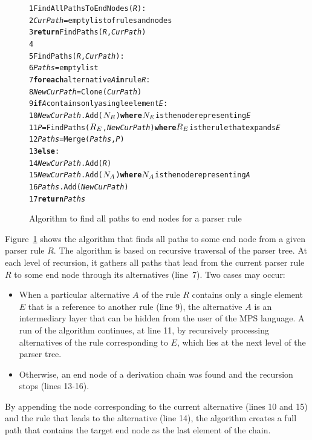 \begin{figure}[ht]
\begin{framed}
\begin{alltt}
\small
 1 FindAllPathsToEndNodes(\textit{R}):
 2   \textit{CurPath} = empty list of rules and nodes
 3   \textbf{return} FindPaths(\textit{R}, \textit{CurPath})
 4
 5 FindPaths(\textit{R}, \textit{CurPath}):
 6  \textit{Paths} = empty list
 7  \textbf{for each} alternative \textit{A} \textbf{in} rule \textit{R}:
 8    \textit{NewCurPath} = Clone(\textit{CurPath})
 9    \textbf{if} \textit{A} contains only a single element \textit{E}:
10      \textit{NewCurPath}.Add(\(N\sb{E}\)) \textbf{where} \(N\sb{E}\) is the node representing \textit{E}
11      \textit{P} = FindPaths(\(R\sb{E}\), \textit{NewCurPath}) \textbf{where} \(R\sb{E}\) is the rule that expands \textit{E}
12      \textit{Paths} = Merge(\textit{Paths}, \textit{P})
13    \textbf{else}:
14      \textit{NewCurPath}.Add(\textit{R})
15      \textit{NewCurPath}.Add(\(N\sb{A}\)) \textbf{where} \(N\sb{A}\) is the node representing \textit{A}
16      \textit{Paths}.Add(\textit{NewCurPath})
17  \textbf{return} \textit{Paths}
\end{alltt}
\end{framed}
\caption{Algorithm to find all paths to end nodes for a parser rule}
\label{fig:SHORTCUTALG}
\end{figure}

Figure~\ref{fig:SHORTCUTALG} shows the algorithm that finds all paths to some end node from a given parser rule $R$.
The algorithm is based on recursive traversal of the parser tree.
At each level of recursion, it gathers all paths that lead from the current parser rule $R$ to some end node through its alternatives (line~7).
Two cases may occur:
\begin{itemize}
	\item When a particular alternative $A$ of the rule $R$ contains only a single element $E$ that is a reference to another rule (line 9), the alternative $A$ is an intermediary layer that can be hidden from the user of the MPS language.
		  A run of the algorithm continues, at line 11, by recursively processing alternatives of the rule corresponding to $E$, which lies at the next level of the parser tree.
	\item Otherwise, an end node of a derivation chain was found and the recursion stops (lines 13-16).
\end{itemize}
By appending the node corresponding to the current alternative (lines 10 and 15) and the rule that leads to the alternative (line 14), the algorithm creates a full path that contains the target end node as the last element of the chain.


